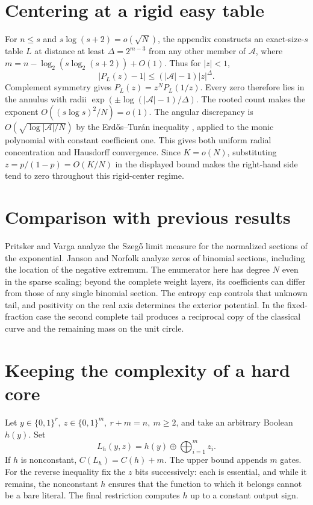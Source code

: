 \documentclass[11pt]{article}
\begin{document}
\section{Centering at a rigid easy table}
For $n\le s$ and $s\log(s+2)=o(\sqrt N)$, the appendix constructs an exact-size-$s$ table $L$ at distance at least $\Delta=2^{m-3}$ from any other member of $\mathcal A$, where $m=n-\log_2(s\log_2(s+2))+O(1)$. Thus for $|z|<1$,
\[
 |P_L(z)-1|\le (|\mathcal A|-1)|z|^\Delta.
\]
Complement symmetry gives $P_L(z)=z^N P_L(1/z)$. Every zero therefore lies in the annulus with radii $\exp(\pm \log(|\mathcal A|-1)/\Delta)$. The rooted count makes the exponent $O((s\log s)^2/N)=o(1)$. The angular discrepancy is $O(\sqrt{\log|\mathcal A|/N})$ by the Erd\H{o}s--Tur\'an inequality \cite{et}, applied to the monic polynomial with constant coefficient one. This gives both uniform radial concentration and Hausdorff convergence. Since $K=o(N)$, substituting $z=p/(1-p)=O(K/N)$ in the displayed bound makes the right-hand side tend to zero throughout this rigid-center regime.
\section{Comparison with previous results}
Pritsker and Varga \cite{pv} analyze the Szeg\H{o} limit measure for the normalized sections of the exponential. Janson and Norfolk \cite{jn} analyze zeros of binomial sections, including the location of the negative extremum. The enumerator here has degree $N$ even in the sparse scaling; beyond the complete weight layers, its coefficients can differ from those of any single binomial section. The entropy cap controls that unknown tail, and positivity on the real axis determines the exterior potential. In the fixed-fraction case the second complete tail produces a reciprocal copy of the classical curve and the remaining mass on the unit circle.
\appendix
\section{Keeping the complexity of a hard core}
Let \(y\in\{0,1\}^r,\ z\in\{0,1\}^m,\ r+m=n,\ m\ge2\), and take an arbitrary Boolean \(h(y)\). Set
\[
                   L_h(y,z)=h(y)\oplus\bigoplus_{i=1}^m z_i .
\]
If \(h\) is nonconstant, \(C(L_h)=C(h)+m\). The upper bound appends \(m\) gates. For the reverse inequality fix the \(z\) bits successively: each is essential, and while it remains, the nonconstant \(h\) ensures that the function to which it belongs cannot be a bare literal. The final restriction computes \(h\) up to a constant output sign.
\end{document}
